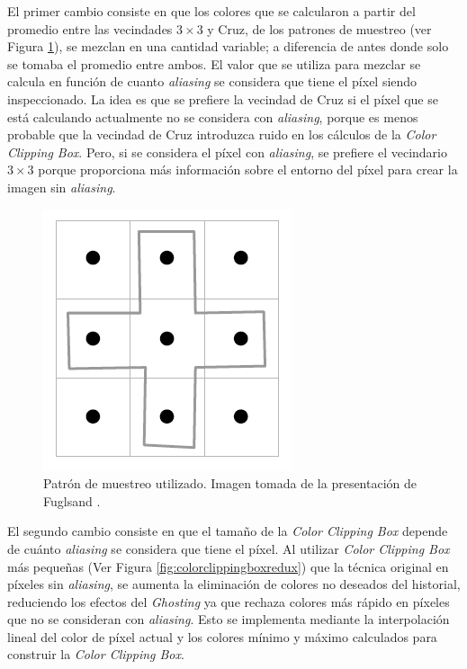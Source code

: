 \documentclass[pregrado]{tesis-usb} %
\begin{document}
El primer cambio consiste en que los colores que se calcularon a partir del promedio entre las vecindades $3\times 3$ y Cruz, de los patrones de muestreo (ver Figura \ref{fig:samplingpattern_2}), se mezclan en una cantidad variable; a diferencia de antes donde solo se tomaba el promedio entre ambos. El valor que se utiliza para mezclar se calcula en función de cuanto \textit{aliasing} se considera que tiene el píxel siendo inspeccionado. La idea es que se prefiere la vecindad de Cruz si el píxel que se está calculando actualmente no se considera con \textit{aliasing}, porque es menos probable que la vecindad de Cruz introduzca ruido en los cálculos de la \textit{Color Clipping Box}. Pero, si se considera el píxel con \textit{aliasing}, se prefiere el vecindario $3\times 3$ porque proporciona más información sobre el entorno del píxel para crear la imagen sin \textit{aliasing}. 

\begin{figure}[!hbt]
	\centering
	\includegraphics[scale=0.3]{images/sampling_pattern.png}
	\caption{Patrón de muestreo utilizado. Imagen tomada de la presentación de Fuglsand \protect\cite{Fuglsand2016}.}\label{fig:samplingpattern_2}
\end{figure}

El segundo cambio consiste en que el tamaño de la \textit{Color Clipping Box} depende de cuánto \textit{aliasing} se considera que tiene el píxel. Al utilizar \textit{Color Clipping Box} más pequeñas (Ver Figura \ref{fig:colorclippingboxredux}) que la técnica original en píxeles sin \textit{aliasing}, se aumenta la eliminación de colores no deseados del historial, reduciendo los efectos del \textit{Ghosting} ya que rechaza colores más rápido en píxeles que no se consideran con \textit{aliasing}. Esto se implementa mediante la interpolación lineal del color de píxel actual y los colores mínimo y máximo calculados para construir la \textit{Color Clipping Box}.
\end{document}
